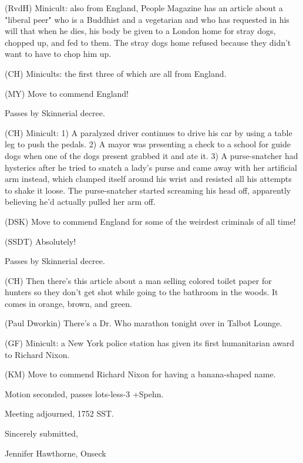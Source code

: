 \documentclass[12pt]{article}
\begin{document}
(RvdH) Minicult: also from England, People Magazine has an article about a "liberal peer" who is a Buddhist and a vegetarian and who has requested in his will that when he dies, his body be given to a London home for stray dogs, chopped up, and fed to them. The stray dogs home refused because they didn't want to have to chop him up.

(CH) Minicults: the first three of which are all from England.

(MY) Move to commend England!

Passes by Skinnerial decree.

(CH) Minicult: 1) A paralyzed driver continues to drive his car by using a table leg to push the pedals. 2) A mayor was presenting a check to a school for guide dogs when one of the dogs present grabbed it and ate it. 3) A purse-snatcher had hysterics after he tried to snatch a lady's purse and came away with her artificial arm instead, which clamped itself around his wrist and resisted all his attempts to shake it loose. The purse-snatcher started screaming his head off, apparently believing he'd actually pulled her arm off.

(DSK) Move to commend England for some of the weirdest criminals of all time!

(SSDT) Absolutely!

Passes by Skinnerial decree.

(CH) Then there's this article about a man selling colored toilet paper for hunters so they don't get shot while going to the bathroom in the woods. It comes in orange, brown, and green.

(Paul Dworkin) There's a Dr. Who marathon tonight over in Talbot Lounge.

(GF) Minicult: a New York police station has given its first humanitarian award to Richard Nixon.

(KM) Move to commend Richard Nixon for having a banana-shaped name.

Motion seconded, passes lots-less-3 +Spehn.

\vspace{12pt}

\noindent
Meeting adjourned, 1752 SST.

\vspace{18pt}

\centerline{Sincerely submitted,}
\centerline{Jennifer Hawthorne, Onseck}
\end{document}
